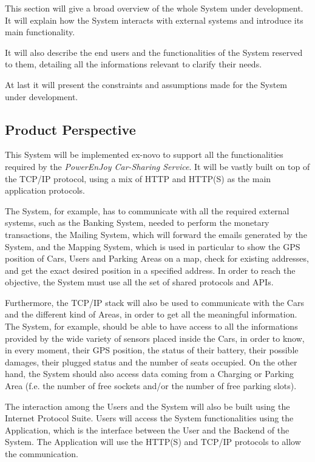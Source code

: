 This section will give a broad overview of the whole System under development. It will explain how the System interacts with external systems and introduce its main functionality.

It will also describe the end users and the functionalities of the System reserved to them, detailing all the informations relevant to clarify their needs.

At last it will present the constraints and assumptions made for the System under development.

\subsection{Product Perspective}
This System will be implemented ex-novo to support all the functionalities required by the \textit{PowerEnJoy Car-Sharing Service}. It will be vastly built on top of the TCP/IP protocol, using a mix of HTTP and HTTP(S) as the main application protocols.

The System, for example, has to communicate with all the required external systems, such as the Banking System, needed to perform the monetary transactions, the Mailing System, which will forward the emails generated by the System, and the Mapping System, which is used in particular to show the GPS position of Cars, Users and Parking Areas on a map, check for existing addresses, and get the exact desired position in a specified address. In order to reach the objective, the System must use all the set of shared protocols and APIs.

Furthermore, the TCP/IP stack will also be used to communicate with the Cars and the different kind of Areas, in order to get all the meaningful information.
The System, for example, should be able to have access to all the informations provided by the wide variety of sensors placed inside the Cars, in order to know, in every moment, their GPS position, the status of their battery, their possible damages, their plugged status and the number of seats occupied. 
On the other hand, the System should also access data coming from a Charging or Parking Area (f.e. the number of free sockets and/or the number of free parking slots).

The interaction among the Users and the System will also be built using the Internet Protocol Suite. Users will access the System functionalities using the Application, which is the interface between the User and the Backend of the System. The Application will use the HTTP(S) and TCP/IP protocols to allow the communication.

